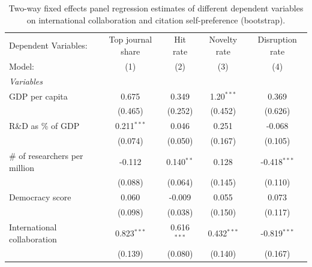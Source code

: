
\begin{table}[H]
   \caption{\label{tab:quality_polity2} Two-way fixed effects panel regression estimates of different dependent variables on international
   collaboration and citation self-preference (bootstrap).}
   \centering
   \scriptsize
   \renewcommand*{\arraystretch}{0.7}
   \begin{tabular}{lcccc}
      \tabularnewline \midrule \midrule
      Dependent Variables:                                           & Top journal share & Hit rate      & Novelty rate  & Disruption rate\\  
      Model:                                                         & (1)               & (2)           & (3)           & (4)\\  
      \midrule
      \emph{Variables}\\
      GDP per capita                                                 & 0.675             & 0.349         & 1.20$^{***}$  & 0.369\\   
                                                                     & (0.465)           & (0.252)       & (0.452)       & (0.626)\\   
      R\&D as \% of GDP                                              & 0.211$^{***}$     & 0.046         & 0.251         & -0.068\\   
                                                                     & (0.074)           & (0.050)       & (0.167)       & (0.105)\\   
      \# of researchers per million                                  & -0.112            & 0.140$^{**}$  & 0.128         & -0.418$^{***}$\\   
                                                                     & (0.088)           & (0.064)       & (0.145)       & (0.110)\\   
      Democracy score                                                & 0.060             & -0.009        & 0.055         & 0.073\\   
                                                                     & (0.098)           & (0.038)       & (0.150)       & (0.117)\\   
      International collaboration                                    & 0.823$^{***}$     & 0.616$^{***}$ & 0.432$^{***}$ & -0.819$^{***}$\\   
                                                                     & (0.139)           & (0.080)       & (0.140)       & (0.167)\\   

\end{tabular}
\end{table}
